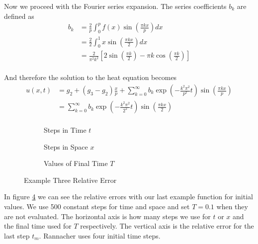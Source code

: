 \documentclass[00main.tex]{subfiles}
\begin{document}
Now we proceed with the Fourier series expansion. The series coefficients $b_k$ are defined as \begin{align*}
b_k &= \frac{2}{p} \int_0^p f(x) \sin \left( \frac{\pi kx}{p} \right) dx\\
&= \frac{2}{2} \int_0^1 x \sin \left( \frac{\pi kx}{2} \right) dx\\
&= \frac{2}{\pi^2 k^2} \left[ 2 \sin \left( \frac{\pi k}{2} \right) - \pi k \cos \left( \frac{\pi k}{2} \right) \right]\\
\end{align*}


And therefore the solution to the heat equation becomes \begin{align*}
u(x,t) &= g_2 + (g_3 - g_2) \frac{x}{p} + \sum_{k=0}^\infty b_k \exp \left( - \frac{k^2 \pi^2}{p^2} t \right) \sin \left( \frac{\pi kx}{p} \right) \\
&= \sum_{k=0}^\infty b_k \exp \left( - \frac{k^2 \pi^2}{2^2} t \right) \sin \left( \frac{\pi kx}{2} \right) \\
\end{align*}



\begin{figure}
\centering
\begin{subfigure}[b]{0.4\textwidth}
\resizebox{1\textwidth}{!}{
}
\caption{Steps in Time $t$}
\label{ex4_rel_err_t}
\end{subfigure}
\begin{subfigure}[b]{0.4\textwidth}
\resizebox{1\textwidth}{!}{
}
\caption{Steps in Space $x$}
\label{ex4_rel_err_x}
\end{subfigure}

\begin{subfigure}[b]{0.4\textwidth}
\resizebox{1\textwidth}{!}{
}
\caption{Values of Final Time $T$}
\label{ex4_rel_err_tt}
\end{subfigure}

\caption{Example Three Relative Error}
\label{ex4_rel_err}
\end{figure}

In figure \ref{ex4_rel_err} we can see the relative errors with our last example function for initial values. We use 500 constant steps for time and space and set $T = 0.1$ when they are not evaluated. The horizontal axis is how many steps we use for $t$ or $x$ and the final time used for $T$ respectively. The vertical axis is the relative error for the last step $t_m$. Rannacher uses four initial time steps. 
\end{document}
